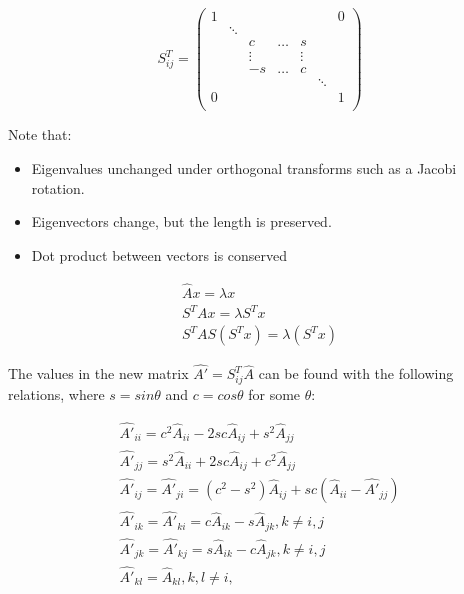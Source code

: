 \documentclass{article}
\begin{document}
\begin{equation}
S_{ij}^T = 
\left( \begin{array}{ccccccc}
1 &       &       &       &       &     &        0 \\
	 &\ddots &     &       &       &     &              \\
	 &       &  c    & \dots&  s    &     &              \\
	 &       &\vdots &       & \vdots&     &              \\
	 &       &   -s  & \dots &   c   &     &              \\
	 &       &       &       &       &\ddots&             \\
0 &       &       &       &       &     &   1  \\
\end{array} \right)
\end{equation} 


Note that:
\begin{itemize}  
\item Eigenvalues unchanged under orthogonal transforms such as a Jacobi rotation.
\item Eigenvectors change, but the length is preserved.
\item Dot product between vectors is conserved
\end{itemize}

\begin{eqnarray}
\hat{A} x = \lambda x \\
S^T A x = \lambda S^T x \\
S^T A S (S^T x) = \lambda (S^T x)
\end{eqnarray}

The values in the new matrix $\hat{A'}=S_{ij}^T\hat{A}$ can be found with the following relations, where $s=sin\theta$ and $c=cos\theta$ for some $\theta$:

\begin{eqnarray}
\hat{A'}_{ii} = c^2\hat{A}_{ii} - 2sc\hat{A}_{ij} + s^2\hat{A}_{jj} \\
\hat{A'}_{jj} = s^2\hat{A}_{ii} + 2sc\hat{A}_{ij} + c^2\hat{A}_{jj} \\
\hat{A'}_{ij} = \hat{A'}_{ji} = (c^2 - s^2)\hat{A}_{ij} + sc(\hat{A}_{ii} - \hat{A'}_{jj} )  \\
\hat{A'}_{ik} = \hat{A'}_{ki} = c\hat{A}_{ik} - s\hat{A}_{jk}, k\not= i,j \\
\hat{A'}_{jk} = \hat{A'}_{kj} = s\hat{A}_{ik} - c\hat{A}_{jk}, k\not= i,j \\
\hat{A'}_{kl} = \hat{A}_{kl} ,  k,l\not= i, 
\end{eqnarray}
\end{document}
